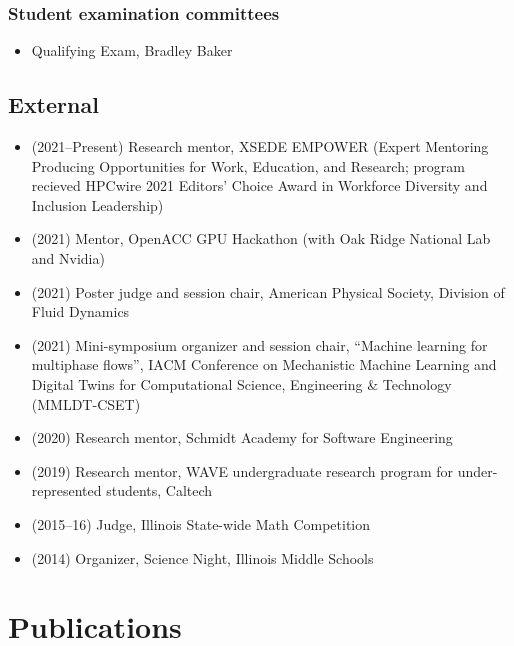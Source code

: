 \subsubsection{Student examination committees}
\begin{itemize}
    \item Qualifying Exam, Bradley Baker
\end{itemize}

\subsection{External}
\begin{itemize}
    \item (2021--Present) Research mentor, XSEDE EMPOWER (Expert Mentoring Producing Opportunities for Work, Education, and Research; program recieved HPCwire 2021 Editors' Choice Award in Workforce Diversity and Inclusion Leadership)
    \item (2021) Mentor, OpenACC GPU Hackathon (with Oak Ridge National Lab and Nvidia)
    \item (2021) Poster judge and session chair, American Physical Society, Division of Fluid Dynamics
    \item (2021) Mini-symposium organizer and session chair, ``Machine learning for multiphase flows'', IACM Conference on Mechanistic Machine Learning and Digital Twins for Computational Science, Engineering \& Technology (MMLDT-CSET)
    \item (2020) Research mentor, Schmidt Academy for Software Engineering
    \item (2019) Research mentor, WAVE undergraduate research program for under-represented students, Caltech
    \item (2015--16) Judge, Illinois State-wide Math Competition
    \item (2014) Organizer, Science Night, Illinois Middle Schools
\end{itemize}



\section{Publications}

\nocite{*}

\newrefcontext[labelprefix=P]
\printbibliography[type=unpublished,title={Preprints},resetnumbers=true,heading=subbibnumbered]

\newrefcontext[labelprefix=J]
\printbibliography[type=article,title={Journal papers},resetnumbers=true,heading=subbibnumbered]

